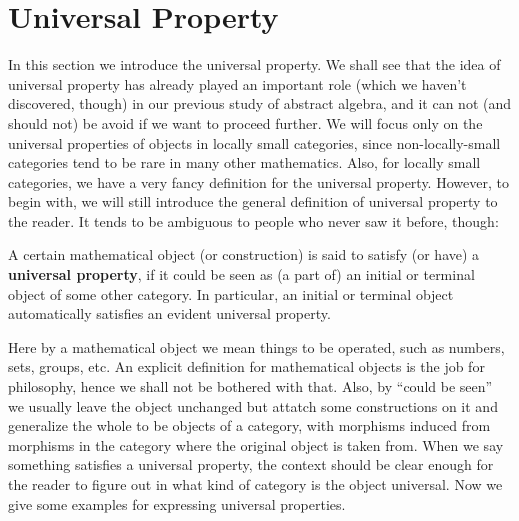 \section{Universal Property}
In this section we introduce the universal property. We shall see that the idea of universal property has already played an important role (which we haven't discovered, though) in our previous study of abstract algebra, and it can not (and should not) be avoid if we want to proceed further. We will focus only on the universal properties of objects in locally small categories, since non-locally-small categories tend to be rare in many other mathematics. Also, for locally small categories, we have a very fancy definition for the universal property. However, to begin with, we will still introduce the general definition of universal property to the reader. It tends to be ambiguous to people who never saw it before, though:
\begin{definition}
A certain mathematical object (or construction) is said to satisfy (or have) a \textbf{universal property}, if it could be seen as (a part of) an initial or terminal object of some other category. In particular, an initial or terminal object automatically satisfies an evident universal property. 
\end{definition}
Here by a mathematical object we mean things to be operated, such as numbers, sets, groups, etc. An explicit definition for mathematical objects is the job for philosophy, hence we shall not be bothered with that. Also, by ``could be seen'' we usually leave the object unchanged but attatch some constructions on it and generalize the whole to be objects of a category, with morphisms induced from morphisms in the category where the original object is taken from. When we say something satisfies a universal property, the context should be clear enough for the reader to figure out in what kind of category is the object universal. Now we give some examples for expressing universal properties. 
